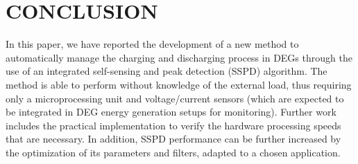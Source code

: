    


\section{CONCLUSION}

In this paper, we have reported the development of a new method to automatically manage the charging  and discharging process in DEGs through the use of an integrated self-sensing and peak detection (SSPD) algorithm. The method is able to perform without knowledge of the external load, thus requiring only a microprocessing unit and voltage/current sensors (which are expected to be integrated in DEG energy generation setups for monitoring). Further work includes the practical implementation to verify the hardware processing speeds that are necessary. In addition, SSPD performance can be further increased by the optimization of its parameters and filters, adapted to a chosen application. 

